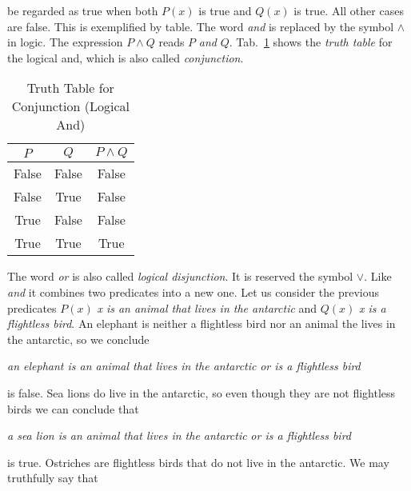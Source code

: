             be regarded as true when both $P(x)$ is true and $Q(x)$ is true.
            All other cases are false. This is exemplified by table. The word
            \textit{and} is replaced by the symbol $\land$ in logic. The
            expression $P\land{Q}$ reads $P$ \textit{and} $Q$.
            Tab.~\ref{tab:truth_table_conjunction} shows the
            \textit{truth table} for the logical and, which is also called
            \textit{conjunction}.
            \begin{table}[H]
                \centering
                \begin{tabular}{c | c | c}
                    $P$&$Q$&$P\land{Q}$\\
                    \hline
                    False&False&False\\
                    \hline
                    False&True&False\\
                    \hline
                    True&False&False\\
                    \hline
                    True&True&True
                \end{tabular}
                \caption{Truth Table for Conjunction (Logical And)}
                \label{tab:truth_table_conjunction}
            \end{table}
            The word \textit{or} is also called
            \textit{logical disjunction}. It is reserved the symbol $\lor$. Like
            \textit{and} it combines two predicates into a new one. Let us
            consider the previous predicates
            $P(x)$ \textit{x is an animal that lives in the antarctic} and
            $Q(x)$ \textit{x is a flightless bird}. An elephant is neither a
            flightless bird nor an animal the lives in the antarctic, so we
            conclude
            \begin{center}
                \textit{an elephant is an animal that lives in the antarctic}
                \textit{or is a flightless bird}
            \end{center}
            is false. Sea lions do live in the antarctic, so even though they
            are not flightless birds we can conclude that
            \begin{center}
                \textit{a sea lion is an animal that lives in the antarctic}
                \textit{or is a flightless bird}
            \end{center}
            is true. Ostriches are flightless birds that do not live in the
            antarctic. We may truthfully say that
